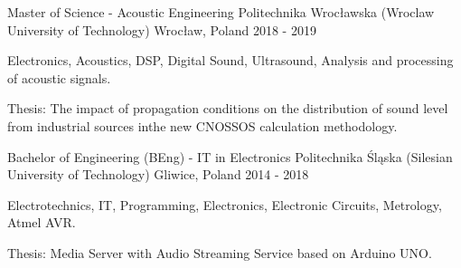 
\begin{cventries}

  \cventry
  {Master of Science - Acoustic Engineering} %
  {Politechnika Wrocławska (Wroclaw University of Technology)} %
  {Wrocław, Poland} %
  {2018 - 2019} %
  {
    \begin{cvitems} %
      \item {Electronics, Acoustics, DSP, Digital Sound, Ultrasound, Analysis and processing of acoustic signals.}
      \item {Thesis: The impact of propagation conditions on the distribution of sound level from industrial sources inthe new CNOSSOS calculation methodology.}
    \end{cvitems}
  }

  \cventry
  {Bachelor of Engineering (BEng) - IT in Electronics} %
  {Politechnika Śląska (Silesian University of Technology)} %
  {Gliwice, Poland} %
  {2014 - 2018} %
  {
    \begin{cvitems} %
      \item {Electrotechnics, IT, Programming, Electronics, Electronic Circuits, Metrology, Atmel AVR.}
      \item {Thesis: Media Server with Audio Streaming Service based on Arduino UNO.}
    \end{cvitems}
  }

\end{cventries}
